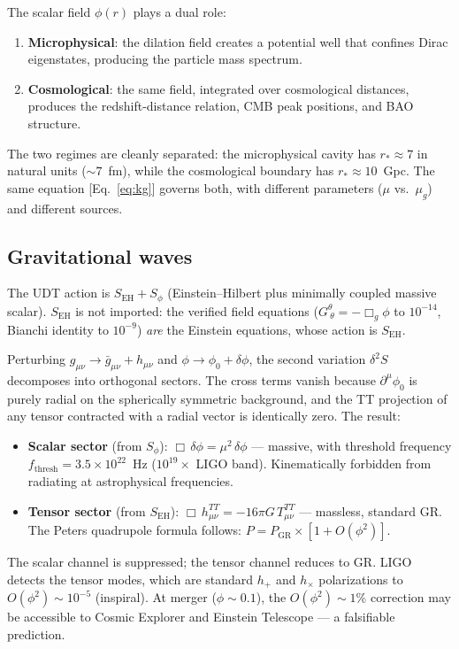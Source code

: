 \documentclass[aps,prd,twocolumn,superscriptaddress,nofootinbib,longbibliography]{revtex4-2}
\newcommand{\rstar}{r_{*}}
\newcommand{\mug}{\mu_g}
\begin{document}
The scalar field $\phi(r)$ plays a dual role:
\begin{enumerate}
\item \textbf{Microphysical}: the dilation field creates a potential
  well that confines Dirac eigenstates, producing the particle mass
  spectrum.
\item \textbf{Cosmological}: the same field, integrated over
  cosmological distances, produces the redshift-distance relation,
  CMB peak positions, and BAO structure.
\end{enumerate}
The two regimes are cleanly separated: the microphysical cavity has
$\rstar \approx 7$ in natural units ($\sim 7$~fm), while the
cosmological boundary has $\rstar \approx 10$~Gpc.  The same equation
[Eq.~\eqref{eq:kg}] governs both, with different parameters
($\mu$ vs.\ $\mug$) and different sources.

\subsection{Gravitational waves}

The UDT action is $S_\mathrm{EH} + S_\phi$ (Einstein--Hilbert plus
minimally coupled massive scalar).  $S_\mathrm{EH}$ is not imported:
the verified field equations ($G^\theta_{\ \theta} = -\Box_g\phi$ to
$10^{-14}$, Bianchi identity to $10^{-9}$) \emph{are} the Einstein
equations, whose action is $S_\mathrm{EH}$.

Perturbing $g_{\mu\nu} \to \bar{g}_{\mu\nu} + h_{\mu\nu}$ and
$\phi \to \phi_0 + \delta\phi$, the second variation $\delta^2 S$
decomposes into orthogonal sectors.  The cross terms vanish because
$\partial^\mu\phi_0$ is purely radial on the spherically symmetric
background, and the TT projection of any tensor contracted with a
radial vector is identically zero.  The result:
\begin{itemize}
\item \textbf{Scalar sector} (from $S_\phi$):
  $\Box\,\delta\phi = \mu^2\,\delta\phi$ --- massive, with threshold
  frequency $f_\mathrm{thresh} = 3.5 \times 10^{22}$~Hz
  ($10^{19}\times$ LIGO band).  Kinematically forbidden from
  radiating at astrophysical frequencies.
\item \textbf{Tensor sector} (from $S_\mathrm{EH}$):
  $\Box\,h^{TT}_{\mu\nu} = -16\pi G\,T^{TT}_{\mu\nu}$ --- massless,
  standard GR.  The Peters quadrupole formula follows:
  $P = P_\mathrm{GR} \times [1 + O(\phi^2)]$.
\end{itemize}
The scalar channel is suppressed; the tensor channel reduces to GR.  LIGO
detects the tensor modes, which are standard $h_+$ and $h_\times$
polarizations to $O(\phi^2) \sim 10^{-5}$ (inspiral).  At merger
($\phi \sim 0.1$), the $O(\phi^2) \sim 1\%$ correction may be
accessible to Cosmic Explorer and Einstein Telescope --- a falsifiable
prediction.
\end{document}
